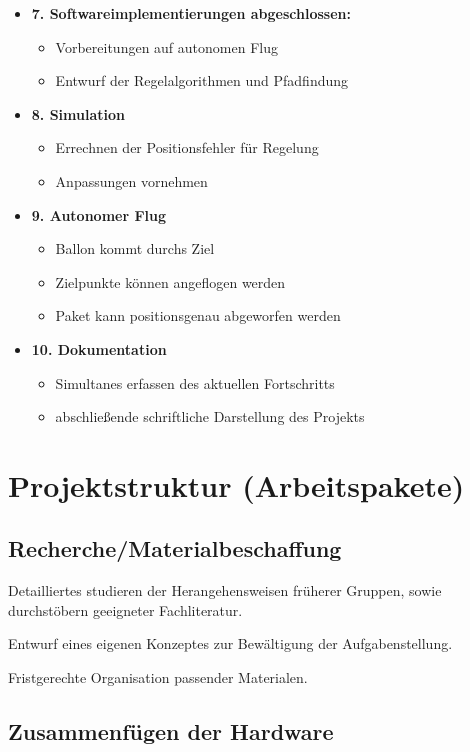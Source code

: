 \documentclass[lang=ngerman,inputenc=utf8,fontsize=10pt]{ldvarticle}
\begin{document}
\begin{itemize}
\begin{itemize}
\end{itemize}
\item \textbf{7. Softwareimplementierungen abgeschlossen:}
\begin{itemize}
\item Vorbereitungen auf autonomen Flug 
\item Entwurf der Regelalgorithmen und Pfadfindung
\end{itemize}
\item \textbf{8. Simulation}
\begin{itemize}
\item Errechnen der Positionsfehler für Regelung
\item Anpassungen vornehmen
\end{itemize}
\item \textbf{9. Autonomer Flug}
\begin{itemize}
\item Ballon kommt durchs Ziel
\item Zielpunkte können angeflogen werden
\item Paket kann positionsgenau abgeworfen werden
\end{itemize}
\item \textbf{10. Dokumentation}
\begin{itemize}
\item Simultanes erfassen des aktuellen Fortschritts
\item abschließende schriftliche Darstellung des Projekts
\end{itemize}


\end{itemize}

\section{Projektstruktur (Arbeitspakete)}


\subsection*{Recherche/Materialbeschaffung}

Detailliertes studieren der Herangehensweisen früherer Gruppen, sowie durchstöbern geeigneter Fachliteratur.

Entwurf eines eigenen Konzeptes zur Bewältigung der Aufgabenstellung.

Fristgerechte Organisation passender Materialen.
 

\subsection*{Zusammenfügen der Hardware}
\end{document}
